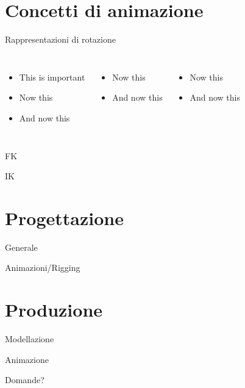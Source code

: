 \documentclass[10pt]{beamer}
\begin{document}
\section{Concetti di animazione}
\begin{frame}{Rappresentazioni di rotazione}
  \begin{columns}[T,onlytextwidth]
      \begin{itemize}[<+- | alert@+>]
        \item \alert<5>{This is important}
        \item Now this
        \item And now this
      \end{itemize}

      \begin{itemize}[<+- | alert@+>]
        \item Now this
        \item And now this
      \end{itemize}

      \begin{itemize}[<+- | alert@+>]
        \item Now this
        \item And now this
      \end{itemize}
  \end{columns}
\end{frame}
\begin{frame}{FK}
\end{frame}
\begin{frame}{IK}
\end{frame}

\section{Progettazione}
\begin{frame}{Generale}
\end{frame}
\begin{frame}{Animazioni/Rigging}
\end{frame}

\section{Produzione}
\begin{frame}{Modellazione}
\end{frame}
\begin{frame}{Animazione}
\end{frame}

{
\begin{frame}[standout]

Domande?

\end{frame}
}
\end{document}
